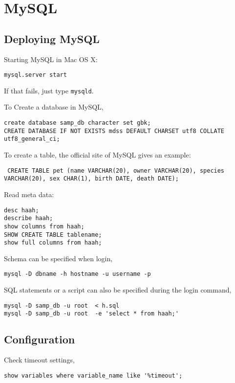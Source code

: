 \section{MySQL}


\subsection{Deploying MySQL}

Starting MySQL in Mac OS X:
\begin{lstlisting}
mysql.server start
\end{lstlisting}
If that fails, just type \verb|mysqld|.

To Create a database in MySQL,
\begin{lstlisting}
create database samp_db character set gbk;
CREATE DATABASE IF NOT EXISTS mdss DEFAULT CHARSET utf8 COLLATE utf8_general_ci;
\end{lstlisting}


To create a table, the official site of MySQL gives an example:
\begin{lstlisting}
 CREATE TABLE pet (name VARCHAR(20), owner VARCHAR(20), species VARCHAR(20), sex CHAR(1), birth DATE, death DATE);
\end{lstlisting}

Read meta data:
\begin{lstlisting}
desc haah;
describe haah;
show columns from haah;
SHOW CREATE TABLE tablename;
show full columns from haah;
\end{lstlisting}

Schema can be specified when login,
\begin{lstlisting}
mysql -D dbname -h hostname -u username -p
\end{lstlisting}

SQL statements or a script can also be specified during the login command,
\begin{lstlisting}
mysql -D samp_db -u root  < h.sql
mysql -D samp_db -u root  -e 'select * from haah;'
\end{lstlisting}


\subsection{Configuration}

Check timeout settings,
\begin{verbatim}
show variables where variable_name like '%timeout';
\end{verbatim}


